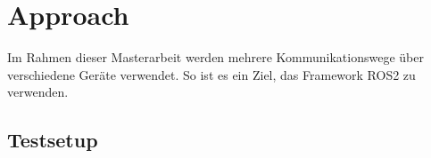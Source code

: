 \chapter{Approach}
\label{Approach}
	Im Rahmen dieser Masterarbeit werden mehrere Kommunikationswege über verschiedene Geräte verwendet.
	So ist es ein Ziel, das Framework ROS2 zu verwenden.
		
	\section{Testsetup}
	\label{Voruntersuchungen:Testsetup}
		
			
		
	